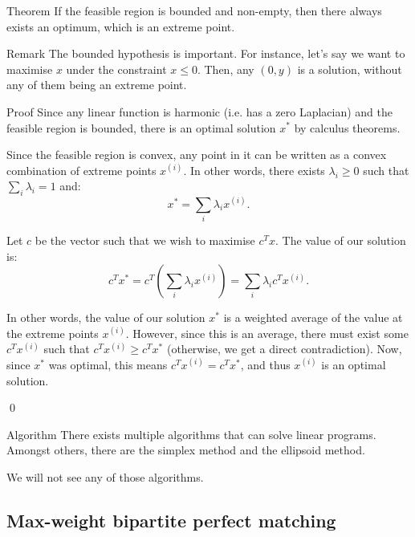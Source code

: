 \documentclass[a4paper]{article}
\begin{document}
\begin{parag}{Theorem}
    If the feasible region is bounded and non-empty, then there always exists an optimum, which is an extreme point.

    \begin{subparag}{Remark}
        The bounded hypothesis is important. For instance, let's say we want to maximise $x$ under the constraint $x \leq 0$. Then, any $\left(0, y\right)$ is a solution, without any of them being an extreme point.
    \end{subparag}

    \begin{subparag}{Proof}
        Since any linear function is harmonic (i.e. has a zero Laplacian) and the feasible region is bounded, there is an optimal solution $x^*$ by calculus theorems.

        Since the feasible region is convex, any point in it can be written as a convex combination of extreme points $x^{\left(i\right)}$. In other words, there exists $\lambda_i \geq 0$ such that $\sum_{i} \lambda_i = 1$ and:
        \[x^* = \sum_{i} \lambda_i x^{\left(i\right)}.\]

        Let $c$ be the vector such that we wish to maximise $c^T x$. The value of our solution is:  
        \[c^T x^* = c^T \left(\sum_{i} \lambda_i x^{\left(i\right)}\right) = \sum_i \lambda_i c^T x^{\left(i\right)}.\]

        In other words, the value of our solution $x^*$ is a weighted average of the value at the extreme points $x^{\left(i\right)}$. However, since this is an average, there must exist some $c^T x^{\left(i\right)}$ such that $c^T x^{\left(i\right)} \geq c^T x^*$ (otherwise, we get a direct contradiction). Now, since $x^*$ was optimal, this means $c^T x^{\left(i\right)} = c^T x^*$, and thus $x^{\left(i\right)}$ is an optimal solution.

        \qed
    \end{subparag}
\end{parag}

\begin{parag}{Algorithm}
    There exists multiple algorithms that can solve linear programs. Amongst others, there are the simplex method and the ellipsoid method.

    We will not see any of those algorithms.
\end{parag}

\subsection{Max-weight bipartite perfect matching}
\end{document}
